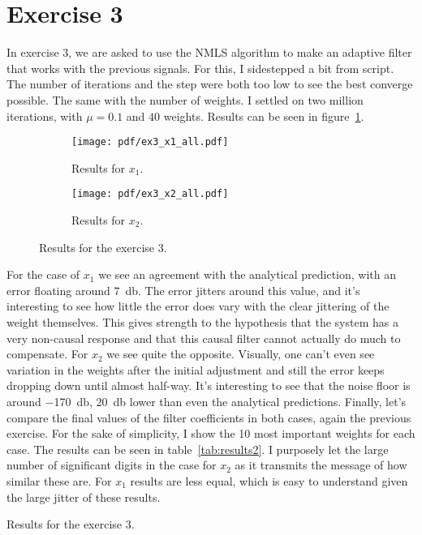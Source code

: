 \FloatBarrier
\section{Exercise 3}

In exercise 3, we are asked to use the NMLS algorithm to make an adaptive filter
that works with the previous signals. For this, I sidestepped a bit from script.
The number of iterations and the step were both too low to see the best converge
possible. The same with the number of weights. I settled on two million
iterations, with \(\mu=0.1\) and \(40\) weights. Results can be seen in
figure~\ref{fig:ex3res}.
\begin{figure}
    \centering
    \begin{subfigure}[t]{0.30\columnwidth}
        \centering
        \texttt{[image: pdf/ex3\_x1\_all.pdf]}
        \caption{Results for \(x_1\).}
    \end{subfigure} \hspace{1cm}
    \begin{subfigure}[t]{0.30\columnwidth}
        \centering
        \texttt{[image: pdf/ex3\_x2\_all.pdf]}
        \caption{Results for \(x_2\).}
    \end{subfigure}
    \caption{Results for the exercise 3.\label{fig:ex3res}}
\end{figure}
For the case of \(x_1\) we see an agreement with the analytical prediction, with
an error floating around \SI{7}{\decibel}. The error jitters around this value,
and it's interesting to see how little the error does vary with the clear
jittering of the weight themselves. This gives strength to the hypothesis that the
system has a very non-causal response and that this causal filter cannot actually
do much to compensate. For \(x_2\) we see quite the opposite. Visually, one can't
even see variation in the weights after the initial adjustment and still the error
keeps dropping down until almost half-way. It's interesting to see that the noise
floor is around \SI{-170}{\decibel}, \SI{20}{\decibel} lower than even the
analytical predictions. Finally, let's compare the final values of the filter
coefficients in both cases, again the previous exercise. For the sake of
simplicity, I show the 10 most important weights for each case. The results can be
seen in table~\ref{tab:results2}. I purposely let the large number of significant
digits in the case for \(x_2\) as it transmits the message of how similar these
are. For \(x_1\) results are less equal, which is easy to understand given the
large jitter of these results.
\begin{table}
    \centering
    
    \caption{Results for the exercise 3.\label{tab:results2}}
\end{table}
